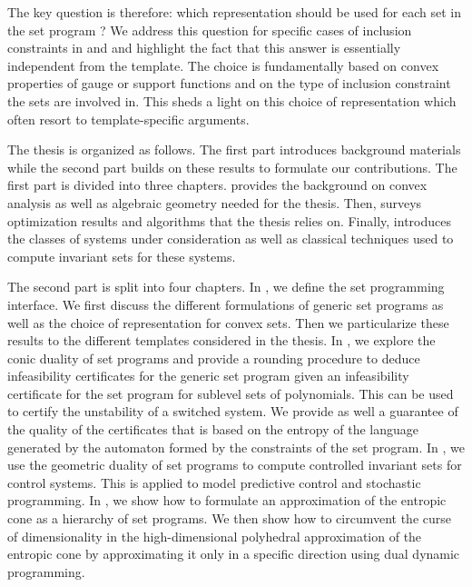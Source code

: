 \begin{itemize}
The key question is therefore: which representation should be used for each set in the set program ?
We address this question for specific cases of inclusion constraints in  and  and highlight the fact that this answer is essentially independent from the template.
The choice is fundamentally based on convex properties of gauge or support functions and on the type of inclusion constraint the sets are involved in.
This sheds a light on this choice of representation which often resort to template-specific arguments.


\end{itemize}





The thesis is organized as follows.
The first part introduces background materials while the second part builds on these results to formulate our contributions.
The first part is divided into three chapters.
 provides the background on convex analysis as well as algebraic geometry needed for the thesis.
Then,  surveys optimization results and algorithms that the thesis relies on.
Finally,  introduces the classes of systems under consideration as well as classical techniques used to compute invariant sets for these systems.

The second part is split into four chapters.
In , we define the set programming interface.
We first discuss the different formulations of generic set programs
as well as the choice of representation for convex sets.
Then we particularize these results to the different templates considered in the thesis.
In , we explore the conic duality of set programs and provide a rounding procedure to deduce infeasibility
certificates for the generic set program given an infeasibility certificate for the set program for sublevel sets of polynomials.
This can be used to certify the unstability of a switched system.
We provide as well a guarantee of the quality of the certificates that is based on the entropy of the language generated by the automaton formed by the constraints of the set program.
In , we use the geometric duality of set programs to compute controlled invariant sets for control systems.
This is applied to model predictive control and stochastic programming.
In , we show how to formulate an approximation
of the entropic cone as a hierarchy of set programs.
We then show how to circumvent the curse of dimensionality in the high-dimensional
polyhedral approximation of the entropic cone by approximating it
only in a specific direction using dual dynamic programming.

